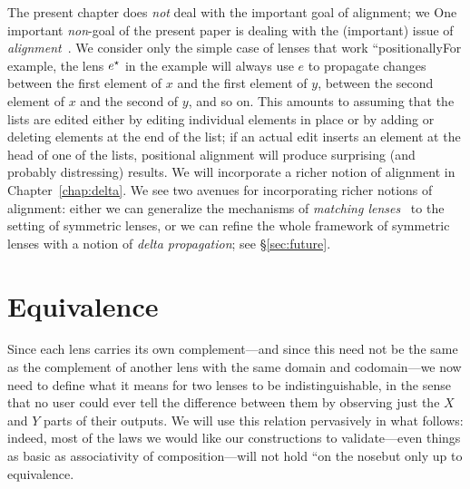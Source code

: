 \ifdissertation
The present chapter does \emph{not} deal with the important goal of
alignment; we
\else
One important {\em non}-goal of the present paper is dealing with
the (important) issue of {\em alignment}~\cite{Boomerang07,Matching10}. We
\fi
consider only the simple case of lenses
that work ``positionally\dotquote For example, the lens $e^\star$ in the example
will always use $e$ to propagate
changes between the first element of $x$ and the first element of $y$,
between the second element of $x$ and the second of $y$, and so on.  This
amounts to assuming that the lists are edited either by editing individual
elements in place or by adding or deleting elements at the end of the list;
if an actual edit inserts an element at the head of one of the lists,
positional alignment will produce surprising (and probably distressing)
results.
\ifdissertation
We will incorporate a richer notion of alignment in
Chapter~\ref{chap:delta}.
\else
We see two avenues for incorporating richer notions of alignment:
either we can generalize the mechanisms of {\em matching
  lenses}~\cite{Matching10} to the setting of symmetric lenses, or we can
refine the whole framework of symmetric lenses with a notion of {\em delta
propagation}; see \S\ref{sec:future}.
\fi%

\section{Equivalence}\label{equiv}

\iftext 
Since each lens carries its own complement---and since this need
not be the same as the 
complement of another lens with the same domain and codomain---we now need to
define what it means for two lenses to be indistinguishable, in the sense
that no user could ever tell the difference between them by observing just the
$X$ and $Y$ parts of their outputs.  We will use this relation pervasively
in what follows: indeed, most of the laws we would like our constructions to
validate---even things as basic as associativity of composition---will not
hold ``on the nose\commaquote but only up to equivalence. 
\fi

